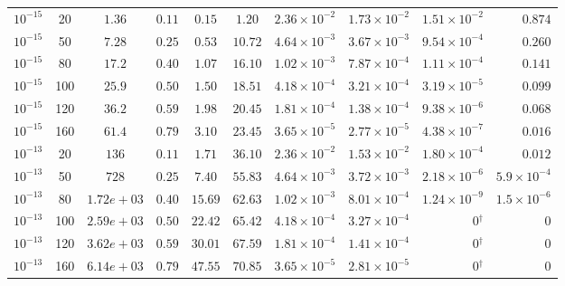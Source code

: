 \documentclass[11pt,a4paper]{article}
\theoremstyle{plain}
\theoremstyle{remark}
\begin{document}
\begin{table}[htbp]
\begin{tabular}{lcccccccrr}
\midrule
$10^{-15}$ & 20 & $1.36$ & $0.11$ & $0.15$ & $1.20$ & $2.36\times10^{-2}$ & $1.73\times10^{-2}$ & $1.51\times10^{-2}$ & $0.874$ \\
$10^{-15}$ & 50 & $7.28$ & $0.25$ & $0.53$ & $10.72$ & $4.64\times10^{-3}$ & $3.67\times10^{-3}$ & $9.54\times10^{-4}$ & $0.260$ \\
$10^{-15}$ & 80 & $17.2$ & $0.40$ & $1.07$ & $16.10$ & $1.02\times10^{-3}$ & $7.87\times10^{-4}$ & $1.11\times10^{-4}$ & $0.141$ \\
$10^{-15}$ & 100 & $25.9$ & $0.50$ & $1.50$ & $18.51$ & $4.18\times10^{-4}$ & $3.21\times10^{-4}$ & $3.19\times10^{-5}$ & $0.099$ \\
$10^{-15}$ & 120 & $36.2$ & $0.59$ & $1.98$ & $20.45$ & $1.81\times10^{-4}$ & $1.38\times10^{-4}$ & $9.38\times10^{-6}$ & $0.068$ \\
$10^{-15}$ & 160 & $61.4$ & $0.79$ & $3.10$ & $23.45$ & $3.65\times10^{-5}$ & $2.77\times10^{-5}$ & $4.38\times10^{-7}$ & $0.016$ \\
\midrule
$10^{-13}$ & 20 & $136$ & $0.11$ & $1.71$ & $36.10$ & $2.36\times10^{-2}$ & $1.53\times10^{-2}$ & $1.80\times10^{-4}$ & $0.012$ \\
$10^{-13}$ & 50 & $728$ & $0.25$ & $7.40$ & $55.83$ & $4.64\times10^{-3}$ & $3.72\times10^{-3}$ & $2.18\times10^{-6}$ & $5.9\times10^{-4}$ \\
$10^{-13}$ & 80 & $1.72e+03$ & $0.40$ & $15.69$ & $62.63$ & $1.02\times10^{-3}$ & $8.01\times10^{-4}$ & $1.24\times10^{-9}$ & $1.5\times10^{-6}$ \\
$10^{-13}$ & 100 & $2.59e+03$ & $0.50$ & $22.42$ & $65.42$ & $4.18\times10^{-4}$ & $3.27\times10^{-4}$ & $0$$^{\dagger}$ & $0$ \\
$10^{-13}$ & 120 & $3.62e+03$ & $0.59$ & $30.01$ & $67.59$ & $1.81\times10^{-4}$ & $1.41\times10^{-4}$ & $0$$^{\dagger}$ & $0$ \\
$10^{-13}$ & 160 & $6.14e+03$ & $0.79$ & $47.55$ & $70.85$ & $3.65\times10^{-5}$ & $2.81\times10^{-5}$ & $0$$^{\dagger}$ & $0$ \\

\bottomrule
\end{tabular}
\end{table}
\end{document}
